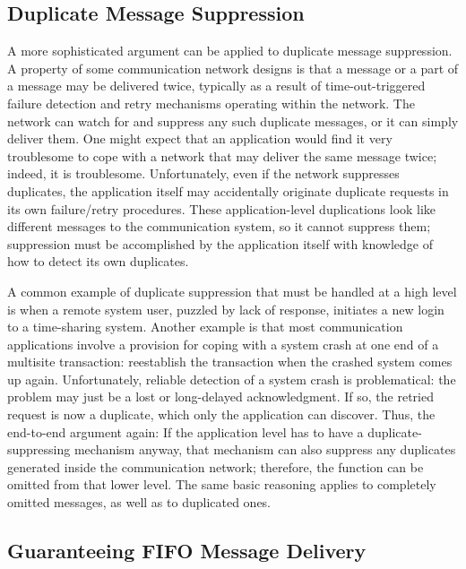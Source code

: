 \documentclass[a4paper,11pt,notitlepage,twoside,openright]{article}
\begin{document}
\hypertarget{duplicate-message-suppression}{%
\subsection{Duplicate Message
Suppression}\label{duplicate-message-suppression}}

A more sophisticated argument can be applied to duplicate message
suppression. A property of some communication network designs is that
a message or a part of a message may be delivered twice, typically as
a result of time-out-triggered failure detection and retry mechanisms
operating within the network. The network can watch for and suppress
any such duplicate messages, or it can simply deliver them. One might
expect that an application would find it very troublesome to cope with
a network that may deliver the same message twice; indeed, it is
troublesome. Unfortunately, even if the network suppresses duplicates,
the application itself may accidentally originate duplicate requests
in its own failure/retry procedures. These application-level
duplications look like different messages to the communication
system, so it cannot suppress them; suppression must be accomplished
by the application itself with knowledge of how to detect
its own duplicates.

A common example of duplicate suppression that must be handled at a high
level is when a remote system user, puzzled by lack of response,
initiates a new login to a time-sharing system. Another example is that
most communication applications involve a provision for coping with a
system crash at one end of a multisite transaction: reestablish the
transaction when the crashed system comes up again. Unfortunately,
reliable detection of a system crash is problematical: the problem may
just be a lost or long-delayed acknowledgment. If so, the retried
request is now a duplicate, which only the application can discover.
Thus, the end-to-end argument again: If the application level has to
have a duplicate-suppressing mechanism anyway, that mechanism can also
suppress any duplicates generated inside the communication network; therefore, the
function can be omitted from that lower level. The same basic reasoning
applies to completely omitted messages, as well as to duplicated ones.


\hypertarget{guaranteeing-fifo-message-delivery}{%
\subsection{Guaranteeing FIFO Message
Delivery}\label{guaranteeing-fifo-message-delivery}}
\end{document}
